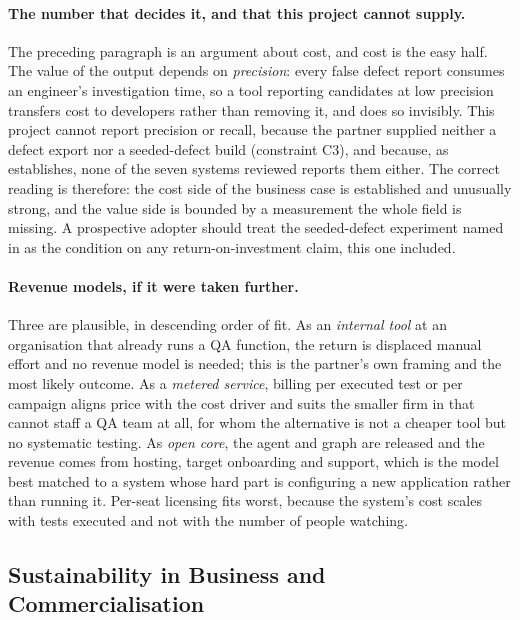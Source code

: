 \paragraph{The number that decides it, and that this project cannot supply.}
The preceding paragraph is an argument about cost, and cost is the easy half.
The value of the output depends on \emph{precision}: every false defect report
consumes an engineer's investigation time, so a tool reporting candidates at
low precision transfers cost to developers rather than removing it, and does so
invisibly. This project cannot report precision or recall, because the partner
supplied neither a defect export nor a seeded-defect build (constraint C3), and
because, as  establishes, none of the seven systems
reviewed reports them either. The correct reading is therefore: the cost side
of the business case is established and unusually strong, and the value side is
bounded by a measurement the whole field is missing. A prospective adopter
should treat the seeded-defect experiment named in  as the
condition on any return-on-investment claim, this one included.

\paragraph{Revenue models, if it were taken further.} Three are plausible, in
descending order of fit. As an \emph{internal tool} at an organisation that
already runs a QA function, the return is displaced manual effort and no
revenue model is needed; this is the partner's own framing and the most likely
outcome. As a \emph{metered service}, billing per executed test or per campaign
aligns price with the cost driver and suits the smaller firm in
 that cannot staff a QA team at all, for whom the alternative
is not a cheaper tool but no systematic testing. As \emph{open core}, the agent
and graph are released and the revenue comes from hosting, target onboarding
and support, which is the model best matched to a system whose hard part is
configuring a new application rather than running it. Per-seat licensing fits
worst, because the system's cost scales with tests executed and not with the
number of people watching.

\subsection{Sustainability in Business and Commercialisation}
\label{sec:commercialisation}

